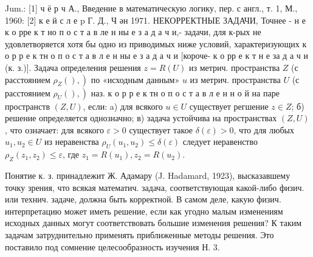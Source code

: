 \documentclass[10pt]{article}
\begin{document}
Jum.: [1] ч ё р ч А., Введение в математическую логику, пер. с англ., т. 1, М., 1960: [2] к е й с л е p Г. Д., Ч ән 1971. НЕКОРРЕКТНЫЕ ЗАДАЧИ, Точнее - н е к о рре к т но п о с т а в ле н ны е з а д а ч и,- задачи, для к-рых не удовлетворяется хотя бы одно из приводимых ниже условий, характеризующих к о р р е к тн о п о с т а в л е н ны е з а д а ч и [короче- к о рр е к т н е за д а ч и (к. з.)]. Задача определения решения $z=R(U)$ из метрич. пространства $Z$ (с расстоянием $\left.\rho_{Z}(),\right)$ по «исходным данным» $u$ из метрич. пространства $U$ (с расстоянием $\left.\rho_{U}(),\right)$ наз. к о р р е к тн о п о с т а в л е н н о й на паре пространств $(Z, U)$, если: a) для всякого $u \in U$ существует регшение $z \in Z$; б) решение определяется однозначно; в) задача устойчива на пространствах $(Z, U)$, что означает: для всякого $\varepsilon>0$ существует такое $\delta(\varepsilon)>0$, что для любых $u_{1}, u_{2} \in U$ из неравенства $\rho_{U}\left(u_{1}, u_{2}\right) \leqslant \delta(\varepsilon)$ следует неравенство $\rho_{Z}\left(z_{1}, z_{2}\right) \leqslant \varepsilon$, где $z_{1}=R\left(u_{1}\right), z_{2}=R\left(u_{2}\right)$.



Понятие к. з. принадлежит Ж. Адамару (J. Hadamard, 1923), высказавшему точку зрения, что всякая математич. задача, соответствующая какой-либо физич. или технич. задаче, должна быть корректной. В самом деле, какую физич. интерпретацию может иметь решение, если как угодно малым изменениям исходных данных могут соответствовать большие изменения решения? К таким задачам затруднительно применять приближенные методы решения. Это поставило под сомнение целесообразность изучения Н. 3.
\end{document}
